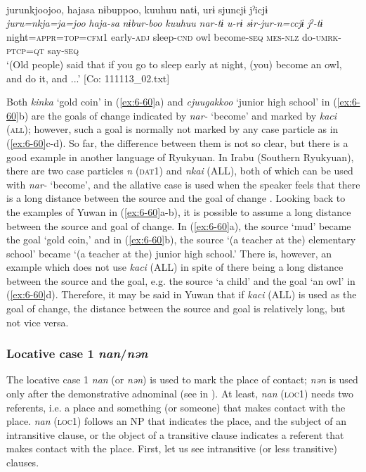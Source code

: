 \ex{}\\
{\TM}
\glll  jurunkjoojoo,  hajasa  nɨbuppoo,  kuuhuu    natɨ,  urɨ  sjuncjɨ  jˀicjɨ\\
\textit{juru=nkja=ja=joo}  \textit{haja-sa}  \textit{nɨbur-boo}  \textit{kuuhuu} \textit{nar-tɨ  u-rɨ  sɨr-jur-n=ccjɨ  jˀ-tɨ}\\
night=\textsc{appr}=\textsc{top}=\textsc{cfm}1  early-\textsc{adj}  sleep-\textsc{cnd}  owl   become-\textsc{seq}  \textsc{mes}-\textsc{nlz}  do-\textsc{umrk}-\textsc{ptcp}=\textsc{qt}  say-\textsc{seq}\\
\glt ‘(Old people) said that if you go to sleep early at night, (you) become an owl, and do it, and ...’ [Co: 111113\_02.txt]
\z

Both \textit{kinka} ‘gold coin’ in (\ref{ex:6-60}a) and \textit{cjuugakkoo} ‘junior high school’ in (\ref{ex:6-60}b) are the goals of change indicated by \textit{nar-} ‘become’ and marked by \textit{kaci} (\textsc{all}); however, such a goal is normally not marked by any case particle as in (\ref{ex:6-60}c-d). So far, the difference between them is not so clear, but there is a good example in another language of Ryukyuan. In Irabu (Southern Ryukyuan), there are two case particles \textit{n} (\textsc{dat}1) and \textit{nkai} (ALL), both of which can be used with \textit{nar-} ‘become’, and the allative case is used when the speaker feels that there is a long distance between the source and the goal of change \citep{Shimoji2013}. Looking back to the examples of Yuwan in (\ref{ex:6-60}a-b), it is possible to assume a long distance between the source and goal of change. In (\ref{ex:6-60}a), the source ‘mud’ became the goal ‘gold coin,’ and in (\ref{ex:6-60}b), the source ‘(a teacher at the) elementary school’ became ‘(a teacher at the) junior high school.’ There is, however, an example which does not use \textit{kaci} (ALL) in spite of there being a long distance between the source and the goal, e.g. the source ‘a child’ and the goal ‘an owl’ in (\ref{ex:6-60}d). Therefore, it may be said in Yuwan that if \textit{kaci} (ALL) is used as the goal of change, the distance between the source and goal is relatively long, but not vice versa.

\subsubsection{Locative case 1 \textit{nan}/\textit{nən}}

The locative case 1 \textit{nan} (or \textit{nən}) is used to mark the place of contact; \textit{nən} is used only after the demonstrative adnominal (see  in ). At least, \textit{nan} (\textsc{loc1}) needs two referents, i.e. a place and something (or someone) that makes contact with the place. \textit{nan} (\textsc{loc1}) follows an NP that indicates the place, and the subject of an intransitive clause, or the object of a transitive clause indicates a referent that makes contact with the place. First, let us see intransitive (or less transitive) clauses.

